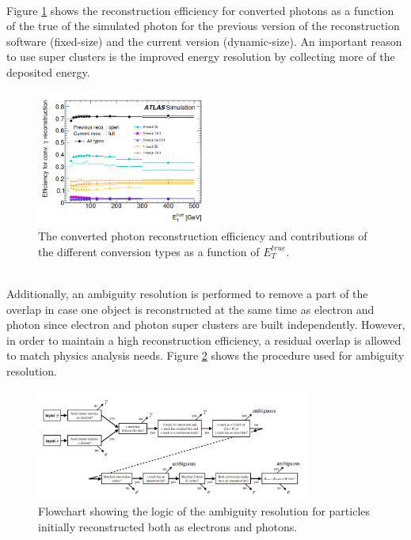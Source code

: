 \\
Figure \ref{fig:chap2:Objects:Egamma:Gamma:Conv:Reco:Eff} shows the reconstruction efficiency for converted photons as a function of the true \eT of the simulated photon for the previous version of the reconstruction software (fixed-size) and the current version (dynamic-size). An important reason to use super clusters is the improved energy resolution by collecting more of the deposited energy.
\begin{figure}[htbp]
    \centering
    \includegraphics[width=0.5\textwidth]{Ch2/Img/Photon_conv_Reco_Eff.png}
    \caption{The converted photon reconstruction efficiency and contributions of the different conversion types as a function of $E^{true}_T$.}
    \label{fig:chap2:Objects:Egamma:Gamma:Conv:Reco:Eff}
\end{figure}
\\
Additionally, an ambiguity resolution is performed to remove a part of the overlap in case one object is reconstructed at the same time as electron and photon since electron and photon super clusters are built independently. However, in order to maintain a high reconstruction efficiency, a residual overlap is allowed to match physics analysis needs. Figure \ref{fig:chap2:Objects:Egamma:Ambg} shows the procedure used for ambiguity resolution. 
\begin{figure}[htbp]
    \centering
    \includegraphics[width=0.8\textwidth]{Ch2/Img/Ambiguity.png}
    \caption{Flowchart showing the logic of the ambiguity resolution for particles initially reconstructed both as electrons and photons.}
    \label{fig:chap2:Objects:Egamma:Ambg}
\end{figure}
